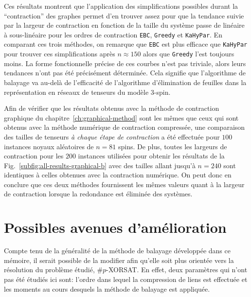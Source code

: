 Ces résultats montrent que l'application des simplifications possibles durant la ``contraction'' des graphes permet d'en trouver assez pour que la tendance suivie par la largeur de contraction en fonction de la taille du système passe de linéaire à sous-linéaire pour les ordres de contraction \verb|EBC|, \verb|Greedy| et \verb|KaHyPar|.
En comparant ces trois méthodes, on remarque que \verb|EBC| est plus efficace que \verb|KaHyPar| pour trouver ces simplifications après $n \approx 150$ alors que \verb|Greedy| l'est toujours moins.
La forme fonctionnelle précise de ces courbes n'est pas triviale, alors leurs tendances n'ont pas été précisément déterminée.
Cela signifie que l'algorithme de balayage va au-delà de l'efficacité de l'algorithme d'élimination de feuilles dans la représentation en réseaux de tenseurs du modèle $3$-spin.

Afin de vérifier que les résultats obtenus avec la méthode de contraction graphique du chapitre~\ref{ch:graphical-method} sont les mêmes que ceux qui sont obtenus avec la méthode numérique de contraction compressée, une comparaison des tailles de tenseurs \emph{à chaque étape de contraction} a été effectuée pour $100$ instances noyaux aléatoires de $n = 81$ spins.
De plus, toutes les largeurs de contraction pour les $200$ instances utilisées pour obtenir les résultats de la Fig.~\ref{subfig:all-results-graphical-b} avec des tailles allant jusqu'à $n = 240$ sont identiques à celles obtenues avec la contraction numérique.
On peut donc en conclure que ces deux méthodes fournissent les mêmes valeurs quant à la largeur de contraction lorsque la redondance est éliminée des systèmes.


\chapter{Possibles avenues d'amélioration}\label{ch:possible-ameliorations}


Compte tenu de la généralité de la méthode de balayage développée dans ce mémoire, il serait possible de la modifier afin qu'elle soit plus orientée vers la résolution du problème étudié, \#$p$-XORSAT.
En effet, deux paramètres qui n'ont pas été étudiés ici sont: l'ordre dans lequel la compression de liens est effectuée et les moments au cours desquels la méthode de balayage est appliquée.

